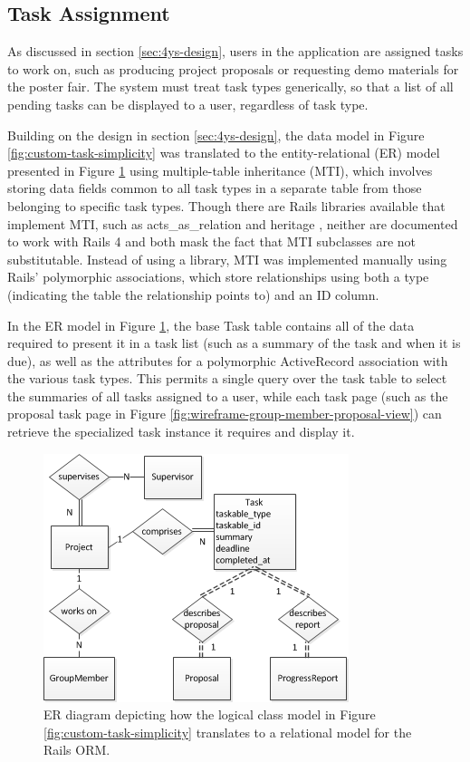 \documentclass[document.tex]{subfiles}
\begin{document}
\FloatBarrier


\subsection{Task Assignment}
\label {sec:4ys-task-assignment}

As discussed in section \ref{sec:4ys-design}, users in the application are assigned tasks to work on, such as producing project proposals or requesting demo materials for the poster fair. The system must treat task types generically, so that a list of all pending tasks can be displayed to a user, regardless of task type.

Building on the design in section \ref{sec:4ys-design}, the data model in Figure \ref{fig:custom-task-simplicity} was translated to the entity-relational (ER) model presented in Figure \ref{fig:custom-task-er-model} using multiple-table inheritance (MTI), which involves storing data fields common to all task types in a separate table from those belonging to specific task types. Though there are Rails libraries available that implement MTI, such as acts\_as\_relation \cite{acts_as_relation} and heritage \cite{heritage}, neither are documented to work with Rails 4 and both mask the fact that MTI subclasses are not substitutable. Instead of using a library, MTI was implemented manually using Rails’ polymorphic associations, which store relationships using both a type (indicating the table the relationship points to) and an ID column.

In the ER model in Figure \ref{fig:custom-task-er-model}, the base Task table contains all of the data required to present it in a task list (such as a summary of the task and when it is due), as well as the attributes for a polymorphic ActiveRecord association with the various task types. This permits a single query over the task table to select the summaries of all tasks assigned to a user, while each task page (such as the proposal task page in Figure \ref{fig:wireframe-group-member-proposal-view}) can retrieve the specialized task instance it requires and display it.

\begin{figure}[!htbp]
\centering \includegraphics{./img/case-study-fourth-year-system/task-through-project-er-model}
\caption{ER diagram depicting how the logical class model in Figure \ref{fig:custom-task-simplicity} translates to a relational model for the Rails ORM.}
\label{fig:custom-task-er-model}
\end{figure}
\end{document}
